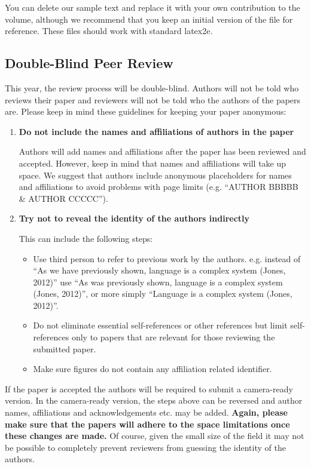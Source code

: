 \documentclass{evolang11}
\begin{document}
You can delete our sample text and replace it with your own
contribution to the volume, although we recommend that you keep an
initial version of the file for reference.  These files should work with
standard latex2e.

\subsection{Double-Blind Peer Review}

This year, the review process will be double-blind.  Authors will not be told who reviews their paper and reviewers will not be told who the authors of the papers are.  Please keep in mind these guidelines for keeping your paper anonymous:

\begin{enumerate}
\item  \textbf{Do not include the names and affiliations of authors in the paper}

Authors will add names and affiliations after the paper has been reviewed and accepted.  However, keep in mind that names and affiliations will take up space.  We suggest that authors include anonymous placeholders for names and affiliations to avoid problems with page limits (e.g. ``AUTHOR BBBBB \& AUTHOR CCCCC'').

\item \textbf{Try not to reveal the identity of the authors indirectly}

This can include the following steps:

\begin{itemize}
\item Use third person to refer to previous work by the authors.  e.g. instead of ``As we have previously shown, language is a complex system (Jones, 2012)'' use ``As was previously shown, language is a complex system (Jones, 2012)'', or more simply ``Language is a complex system (Jones, 2012)''.
\item Do not eliminate essential self-references or other references but limit self-references only to papers that are relevant for those reviewing the submitted paper.
\item Make sure figures do not contain any affiliation related identifier.
\end{itemize}

\end{enumerate}

If the paper is accepted the authors will be required to submit a camera-ready version.  In the camera-ready version, the steps above can be reversed and author names, affiliations and acknowledgements etc. may be added.  \textbf{Again, please make sure that the papers will adhere to the space limitations once these changes are made.}  Of course, given the small size of the field it may not be possible to completely prevent reviewers from guessing the identity of the authors.  
\end{document}
